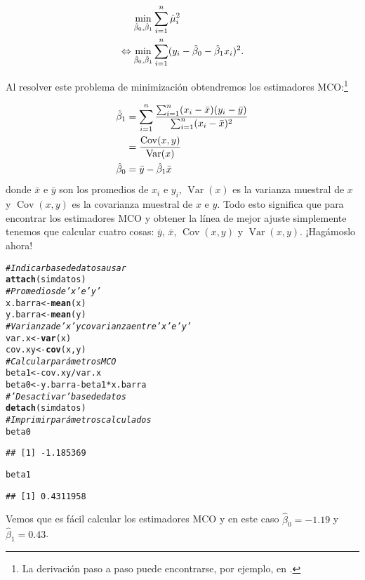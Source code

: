 \documentclass{report}\usepackage[]{graphicx}\usepackage[]{color}
\makeatletter
\newcommand{\hlcom}[1]{\textcolor[rgb]{0.678,0.584,0.686}{\textit{#1}}}%
\newcommand{\hlopt}[1]{\textcolor[rgb]{0,0,0}{#1}}%
\newcommand{\hlstd}[1]{\textcolor[rgb]{0.345,0.345,0.345}{#1}}%
\newcommand{\hlkwb}[1]{\textcolor[rgb]{0.69,0.353,0.396}{#1}}%
\newcommand{\hlkwd}[1]{\textcolor[rgb]{0.737,0.353,0.396}{\textbf{#1}}}%
\newenvironment{kframe}{%
 \def\at@end@of@kframe{}%
 \ifinner\ifhmode%
  \def\at@end@of@kframe{\end{minipage}}%
  \begin{minipage}{\columnwidth}%
 \fi\fi%
 \def\FrameCommand##1{\hskip\@totalleftmargin \hskip-\fboxsep
 \colorbox{shadecolor}{##1}\hskip-\fboxsep
     \hskip-\linewidth \hskip-\@totalleftmargin \hskip\columnwidth}%
 \MakeFramed {\advance\hsize-\width
   \@totalleftmargin\z@ \linewidth\hsize
   \@setminipage}}%
 {\par\unskip\endMakeFramed%
 \at@end@of@kframe}
\newenvironment{knitrout}{}{} %
\newcommand{\Var}{\operatorname{Var}}
\newcommand{\Cov}{\operatorname{Cov}}
\makeatother
\begin{document}
\begin{align}
\min_{\hat\beta_0,\hat\beta_1} & \sum_{i=1}^n \hat\mu_i^2 \notag \\
\Leftrightarrow \min_{\hat\beta_0,\hat\beta_1} & \sum_{i=1}^n (y_i - \hat\beta_0 - \hat\beta_1 x_i)^2.
\label{eq:prob_min_MCO}
\end{align}

Al resolver este problema de minimización obtendremos los estimadores MCO:\footnote{La derivación paso a paso puede encontrarse, por ejemplo, en \textcite[cap. 2]{wooldridge_introductory_2016}.}

\begin{align}
\hat \beta_1 &= \sum_{i=1}^n \frac{\sum_{i=1}^n (x_i - \bar x)(y_i - \bar y)}{\sum_{i=1}^n (x_i - \bar x)^2} \notag \\
 &= \frac{\Cov (x,y)}{\Var(x)} \\
\hat \beta_0 &= \bar y - \hat\beta_1 \bar x
\end{align}
donde $\bar x$ e $\bar y$ son los promedios de $x_i$ e $y_i$, $\Var(x)$ es la varianza muestral de $x$ y $\Cov(x,y)$ es la covarianza muestral de $x$ e $y$.
Todo esto significa que para encontrar los estimadores MCO y obtener la línea de mejor ajuste simplemente tenemos que calcular cuatro cosas: $\bar y$, $\bar x$, $\Cov (x,y)$ y $\Var (x,y)$. ¡Hagámoslo ahora!

\begin{knitrout}
\color{fgcolor}\begin{kframe}
\begin{alltt}
\hlcom{# Indicar base de datos a usar}
\hlkwd{attach}\hlstd{(simdatos)}
\hlcom{# Promedios de 'x' e 'y'}
\hlstd{x.barra} \hlkwb{<-} \hlkwd{mean}\hlstd{(x)}
\hlstd{y.barra} \hlkwb{<-} \hlkwd{mean}\hlstd{(y)}
\hlcom{# Varianza de 'x' y covarianza entre 'x' e 'y'}
\hlstd{var.x} \hlkwb{<-} \hlkwd{var}\hlstd{(x)}
\hlstd{cov.xy} \hlkwb{<-} \hlkwd{cov}\hlstd{(x,y)}
\hlcom{# Calcular parámetros MCO}
\hlstd{beta1} \hlkwb{<-} \hlstd{cov.xy}\hlopt{/}\hlstd{var.x}
\hlstd{beta0} \hlkwb{<-} \hlstd{y.barra} \hlopt{-} \hlstd{beta1}\hlopt{*}\hlstd{x.barra}
\hlcom{# 'Desactivar' base de datos}
\hlkwd{detach}\hlstd{(simdatos)}
\hlcom{# Imprimir parámetros calculados}
\hlstd{beta0}
\end{alltt}
\begin{verbatim}
## [1] -1.185369
\end{verbatim}
\begin{alltt}
\hlstd{beta1}
\end{alltt}
\begin{verbatim}
## [1] 0.4311958
\end{verbatim}
\end{kframe}
\end{knitrout}
Vemos que es fácil calcular los estimadores MCO y en este caso $\hat \beta_0 = -1.19$ y $\hat \beta_1 = 0.43$.
\end{document}
